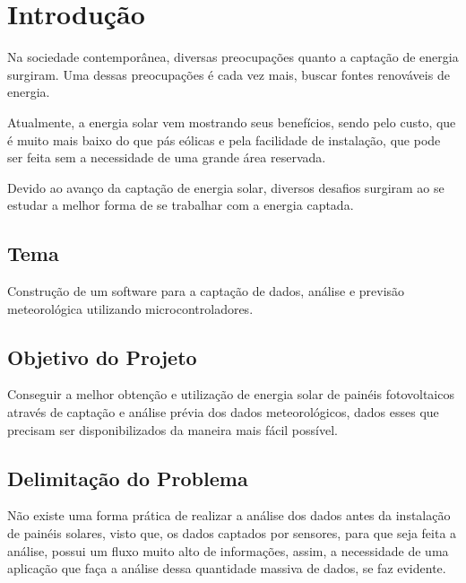 \chapter{Introdução}

Na sociedade contemporânea, diversas preocupações quanto a captação de energia surgiram. Uma dessas preocupações é cada vez mais, buscar fontes renováveis de energia.

Atualmente, a energia solar vem mostrando seus benefícios, sendo pelo custo, que é muito mais baixo do que pás eólicas e pela facilidade de instalação, que pode ser feita sem a necessidade de uma grande área reservada.

Devido ao avanço da captação de energia solar, diversos desafios surgiram ao se estudar a melhor forma de se trabalhar com a energia captada.

\section{Tema}

Construção de um software para a captação de dados, análise e previsão meteorológica utilizando microcontroladores.

\section{Objetivo do Projeto}

Conseguir a melhor obtenção e utilização de energia solar de painéis fotovoltaicos através de captação e análise prévia dos dados meteorológicos, dados esses que precisam ser disponibilizados da maneira mais fácil possível.

\section{Delimitação do Problema}

Não existe uma forma prática de realizar a análise dos dados antes da instalação de painéis solares, visto que, os dados captados por sensores, para que seja feita a análise, possui um fluxo muito alto de informações, assim, a necessidade de uma aplicação que faça a análise dessa quantidade massiva de dados, se faz evidente.

